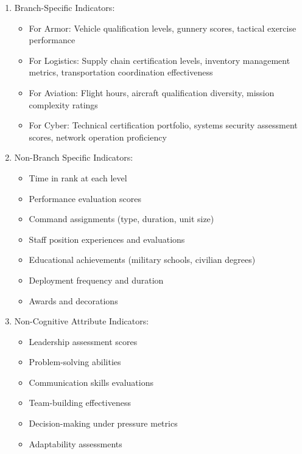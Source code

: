 \documentclass[./main.tex]{subfiles}
\begin{document}
\begin{enumerate}
\def\labelenumi{\arabic{enumi}.}
\tightlist
\item
  Branch-Specific Indicators:

  \begin{itemize}
  \tightlist
  \item
    For Armor: Vehicle qualification levels, gunnery scores, tactical
    exercise performance
  \item
    For Logistics: Supply chain certification levels, inventory
    management metrics, transportation coordination effectiveness
  \item
    For Aviation: Flight hours, aircraft qualification diversity,
    mission complexity ratings
  \item
    For Cyber: Technical certification portfolio, systems security
    assessment scores, network operation proficiency
  \end{itemize}
\item
  Non-Branch Specific Indicators:

  \begin{itemize}
  \tightlist
  \item
    Time in rank at each level
  \item
    Performance evaluation scores
  \item
    Command assignments (type, duration, unit size)
  \item
    Staff position experiences and evaluations
  \item
    Educational achievements (military schools, civilian degrees)
  \item
    Deployment frequency and duration
  \item
    Awards and decorations
  \end{itemize}
\item
  Non-Cognitive Attribute Indicators:

  \begin{itemize}
  \tightlist
  \item
    Leadership assessment scores
  \item
    Problem-solving abilities
  \item
    Communication skills evaluations
  \item
    Team-building effectiveness
  \item
    Decision-making under pressure metrics
  \item
    Adaptability assessments
  \end{itemize}
\end{enumerate}
\end{document}
